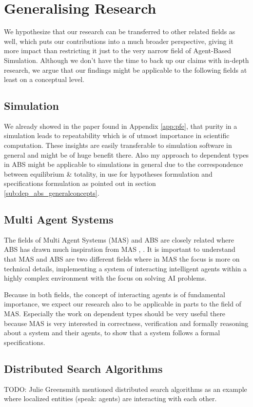 \chapter{Generalising Research}
\label{chap:generalising}

We hypothesize that our research can be transferred to other related fields as well, which puts our contributions into a much broader perspective, giving it more impact than restricting it just to the very narrow field of Agent-Based Simulation. Although we don't have the time to back up our claims with in-depth research, we argue that our findings might be applicable to the following fields at least on a conceptual level.

\section{Simulation}
We already showed in the paper found in Appendix \ref{app:pfe}, that purity in a simulation leads to repeatability which is of utmost importance in scientific computation. These insights are easily transferable to simulation software in general and might be of huge benefit there. Also my approach to dependent types in ABS might be applicable to simulations in general due to the correspondence between equilibrium \& totality, in use for hypotheses formulation and specifications formulation as pointed out in section \ref{sub:dep_abs_generalconcepts}. 

\section{Multi Agent Systems}
The fields of Multi Agent Systems (MAS) and ABS are closely related where ABS has drawn much inspiration from MAS \cite{wooldridge_introduction_2009}, \cite{weiss_multiagent_2013}. It is important to understand that MAS and ABS are two different fields where in MAS the focus is more on technical details, implementing a system of interacting intelligent agents within a highly complex environment with the focus on solving AI problems.

Because in both fields, the concept of interacting agents is of fundamental importance, we expect our research also to be applicable in parts to the field of MAS. Especially the work on dependent types should be very useful there because MAS is very interested in correctness, verification and formally reasoning about a system and their agents, to show that a system follows a formal specifications.

\section{Distributed Search Algorithms}
TODO: Julie Greensmith mentioned distributed search algorithms as an example where localized entities (speak: agents) are interacting with each other.